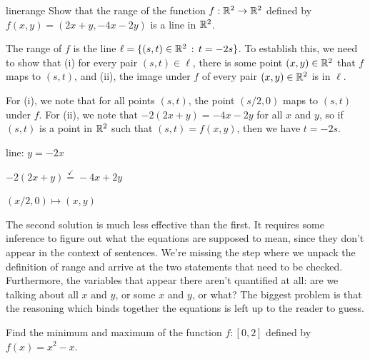 \documentclass{watsonbook}
\begin{document}
  \begin{example}{}{linerange} 
    Show that the range of the function $f:\mathbb{R}^2 \to \mathbb{R}^2$ defined by
    $f(x,y) = (2x + y, -4x - 2y)$ is a line in $\mathbb{R}^2$.
  \end{example}
  
  \begin{solution}[title = Good solution] 
    The range of $f$ is the line $\ell = \{(s,t) \in \mathbb{R}^2 \,: \, t =
    -2s\}$. To establish this, we need to show that (i) for every pair $(s,t) \in
    \ell$, there is some point $(x,y) \in \mathbb{R}^2$ that $f$ maps to
    $(s,t)$, and (ii), the image under $f$ of every pair $(x,y) \in
    \mathbb{R}^2$  is in $\ell$.
    
    For (i), we note that for all points $(s,t)$, the point $(s/2,0)$
    maps to $(s,t)$ under $f$. For (ii), we note that
    $-2(2x + y) = -4x - 2y$ for all $x$ and $y$, so if $(s,t)$ is a
    point in $\mathbb{R}^2$ such that $(s,t) = f(x,y)$, then we have
    $t = -2s$. 
  \end{solution}

  \begin{solution}[title = Solution that needs improvement] 
    line: $y = -2x$

    $-2(2x + y) \stackrel{\checkmark}{=} -4x  +2y$

    $(x/2 , 0) \mapsto (x,y)$
  \end{solution}

  The second solution is much less effective than the first. It
  requires some inference to figure out what the equations are
  supposed to mean, since they don't appear in the context of
  sentences. We're missing the step where we unpack the definition of
  range and arrive at the two statements that need to be
  checked. Furthermore, the variables that appear there aren't
  quantified at all: are we talking about all $x$ and $y$, or some $x$
  and $y$, or what? The biggest problem is that the reasoning which
  binds together the equations is left up to the reader to guess.

  \begin{example}{}{}
    Find the minimum and maximum of the function $f: [0,2]$ defined by
    $f(x) = x^2 - x$. 
  \end{example}
\end{document}
